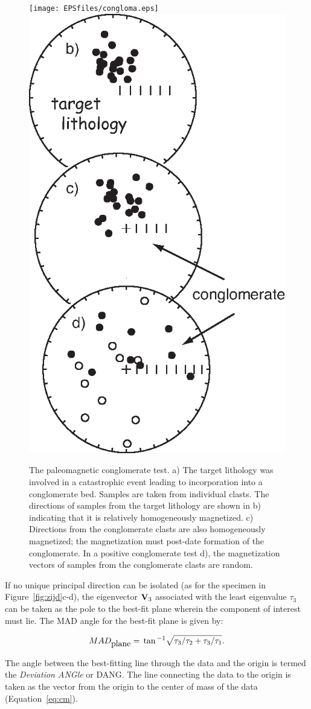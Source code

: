 \begin{figure}[h!tb]
\centering  \texttt{[image: EPSfiles/congloma.eps]}
\centering  \includegraphics[width= 5 cm]{EPSfiles/conglomb.eps}
\caption {The paleomagnetic conglomerate test. a) The target lithology was involved in a catastrophic event leading to incorporation into a conglomerate bed.  Samples are taken from individual clasts.  The directions of samples from
the target lithology are shown in b) indicating that it is relatively
homogeneously magnetized.  
c) Directions from the  conglomerate clasts are also homogeneously
magnetized;
the magnetization must post-date formation of the conglomerate.  
In a positive
conglomerate test d),   the magnetization vectors
of samples from the conglomerate clasts are random.
 }
\label{fig:conglom}
\end{figure}



If no unique principal direction can be isolated (as for the specimen in
Figure~\ref{fig:zijd}c-d), the eigenvector $\hbox{\bf V}_3$ associated with the least 
eigenvalue $\tau_3$ can be taken as
the pole to the best-fit plane wherein  the component of interest must lie. 
The MAD angle for the best-fit plane is given by:

\begin{equation}
MAD_{\hbox {plane}} = \tan^{-1} \sqrt { \tau_3/\tau_2 + \tau_3/\tau_1}.
\label{eq:madP}
\end{equation}

   The angle between the best-fitting line through the data and the origin is termed the 
   {\it Deviation ANGle} or DANG.  
 The line connecting the data to the origin is taken as the vector from the origin to the center of mass of the data (Equation~\ref{eq:cm}).  


